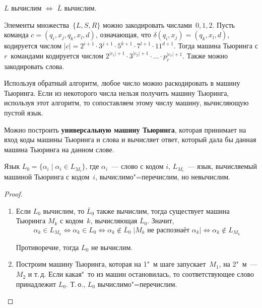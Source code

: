 \begin{statement}
$L$ вычислим $\Leftrightarrow$ $\overline L$ вычислим.
\end{statement}

Элементы множества~$\{ L, S, R \}$ можно закодировать числами~$0, 1, 2$.
Пусть команда $c = (q_i, x_j, q_k, x_l, d)$, означающая, что $\delta(q_i, x_j) = (q_k, x_l, d)$, кодируется числом $|c| = 2^{i+1} \cdot 3^{j+1} \cdot 5^{k+1} \cdot 7^{l+1} \cdot 11^{d+1}$.
Тогда машина Тьюринга с $r$~командами кодируется числом $2^{|c_1| + 1} \cdot 3^{|c_2| + 1} \cdot \ldots \cdot p_r^{|c_r| + 1}$.
Также можно закодировать слова.

Используя обратный алгоритм, любое число можно раскодировать в машину Тьюринга.
Если из некоторого числа нельзя получить машину Тьюринга, используя этот алгоритм, то сопоставляем этому числу машину, вычисляющую пустой язык.

 Можно построить \textbf{универсальную машину Тьюринга}, которая принимает на вход коды машины Тьюринга и слова и вычисляет ответ, который дала бы данная машина Тьюринга на данном слове.

\begin{theorem}
Язык $L_0 = \{ \alpha_i \mid \alpha_i \in L_{M_i} \}$, где $\alpha_i$~--- слово с кодом $i$, $L_{M_i}$~--- язык, вычисляемый машиной Тьюринга с кодом~$i$, вычислимо"=перечислим, но невычислим.
\end{theorem}
\begin{proof}
\begin{enumerate}
	\item Если $L_0$ вычислим, то $\overline L_0$ также вычислим, тогда существует машина Тьюринга $M_k$ с кодом~$k$, вычисляющая $\overline L_0$.
	Значит,
	\begin{equation*}
	\alpha_k \in L_{M_k} \Leftrightarrow
	\alpha_k \in L_0 \Leftrightarrow
	\alpha_k \notin \overline L_0 \;
	|\text{$M_k$ не распознаёт $\alpha_k$}| \Leftrightarrow
	\alpha_k \notin L_{M_k}
	\end{equation*}
	
	Противоречие, тогда $L_0$ не вычислим.
	
	\item Построим машину Тьюринга, которая на 1"~м шаге запускает~$M_1$, на 2"~м~--- $M_2$ и т.\,д.
	Если какая"~то из машин остановилась, то соответствующее слово принадлежит $L_0$.
	Т.\,о., $L_0$ вычислимо"=перечислим.
\end{enumerate}
\end{proof}

